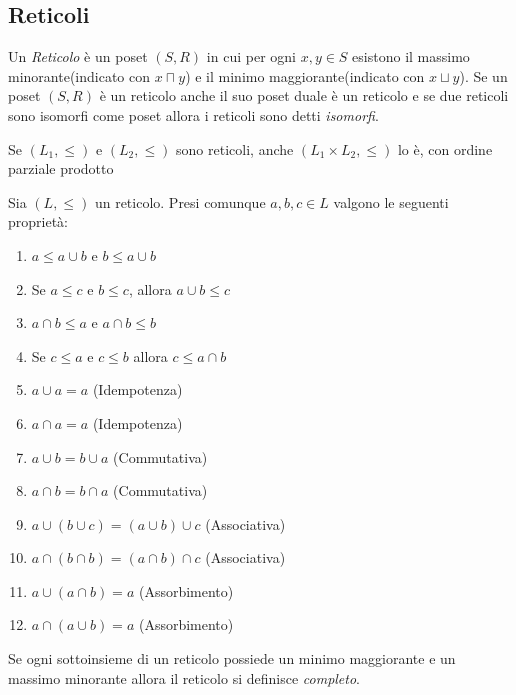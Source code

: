 \subsection{Reticoli}
Un \emph{Reticolo} è un poset $(S,R)$ in cui per ogni $x,y \in S$ esistono
il massimo minorante(indicato con $x \sqcap y$) e il minimo maggiorante(indicato con $x \sqcup y$).
Se un poset $(S,R)$ è un reticolo anche il suo poset duale è un reticolo e se due
reticoli sono isomorfi come poset allora i reticoli sono detti \emph{isomorfi}.

\begin{prop}
    Se $(L_1,\leq)$ e $(L_2,\leq)$ sono reticoli, anche $(L_1 \times L_2,\leq)$ lo è,
    con ordine parziale prodotto
\end{prop}

\begin{defi}
Sia $(L,\leq)$ un reticolo. Presi comunque $a,b,c \in L$ valgono le seguenti proprietà:
\end{defi}
\begin{enumerate}
    \item $a \leq a \cup b$ e $b \leq a \cup b$
    \item Se $a \leq c$ e $b \leq c$, allora $a \cup b \leq c$
    \item $a \cap b \leq a$ e $a \cap b \leq b$
    \item Se $c \leq a$ e $c \leq b$ allora $c \leq a \cap b$
    \item $a \cup a = a$ (Idempotenza)
    \item $a \cap a = a$ (Idempotenza)
    \item $a \cup b = b \cup a$ (Commutativa)
    \item $a \cap b = b \cap a$ (Commutativa)
    \item $a \cup (b \cup c) = (a \cup b) \cup c$ (Associativa)
    \item $a \cap (b \cap b) = (a \cap b) \cap c$ (Associativa)
    \item $a \cup(a \cap b) = a$ (Assorbimento)
    \item $a \cap (a \cup b) = a$ (Assorbimento)
\end{enumerate}

\begin{defi}
    Se ogni sottoinsieme di un reticolo possiede un minimo maggiorante e un massimo minorante
    allora il reticolo si definisce \emph{completo}.
\end{defi}

